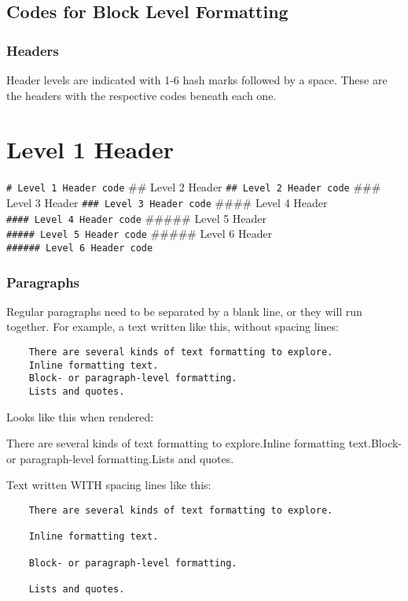 \documentclass[
]{article}
\begin{document}
\hypertarget{codes-for-block-level-formatting}{%
\subsection{Codes for Block Level
Formatting}\label{codes-for-block-level-formatting}}

\hypertarget{headers}{%
\subsubsection{Headers}\label{headers}}

Header levels are indicated with 1-6 hash marks followed by a space.
These are the headers with the respective codes beneath each one.

\hypertarget{level-1-header}{%
\section{Level 1 Header}\label{level-1-header}}

\texttt{\#\ Level\ 1\ Header\ code} \#\# Level 2 Header
\texttt{\#\#\ Level\ 2\ Header\ code} \#\#\# Level 3 Header
\texttt{\#\#\#\ Level\ 3\ Header\ code} \#\#\#\# Level 4 Header
\texttt{\#\#\#\#\ Level\ 4\ Header\ code} \#\#\#\#\# Level 5 Header
\texttt{\#\#\#\#\#\ Level\ 5\ Header\ code} \#\#\#\#\# Level 6 Header
\texttt{\#\#\#\#\#\#\ Level\ 6\ Header\ code}

\hypertarget{paragraphs}{%
\subsubsection{Paragraphs}\label{paragraphs}}

Regular paragraphs need to be separated by a blank line, or they will
run together. For example, a text written like this, without spacing
lines:

\begin{verbatim}
    There are several kinds of text formatting to explore.
    Inline formatting text.
    Block- or paragraph-level formatting.
    Lists and quotes.
\end{verbatim}

Looks like this when rendered:

There are several kinds of text formatting to explore.Inline formatting
text.Block- or paragraph-level formatting.Lists and quotes.

Text written WITH spacing lines like this:

\begin{verbatim}
    There are several kinds of text formatting to explore.

    Inline formatting text.

    Block- or paragraph-level formatting.

    Lists and quotes.
\end{verbatim}
\end{document}
